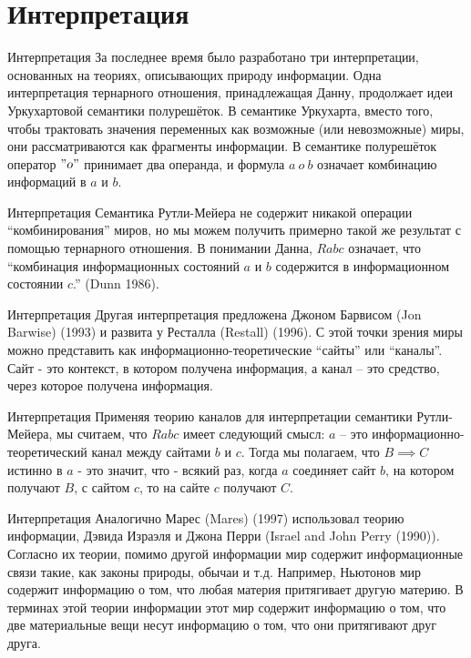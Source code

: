 \documentclass[14pt]{beamer}
\begin{document}
\section{Интерпретация}

\begin{frame}[nologo]{Интерпретация}
За последнее время было разработано три интерпретации, основанных на теориях, 
описывающих природу информации. Одна интерпретация тернарного отношения, 
принадлежащая Данну, продолжает идеи Уркухартовой семантики полурешёток. В 
семантике Уркухарта, вместо того, чтобы трактовать значения переменных как 
возможные (или невозможные) миры, они рассматриваются как фрагменты информации. 
В семантике полурешёток оператор $ "o" $ принимает два операнда, и формула $ 
a~o~b $ означает комбинацию информаций в $ a $ и $ b $.
\end{frame}

\begin{frame}[nologo]{Интерпретация}
Семантика Рутли-Мейера не содержит никакой операции ``комбинирования'' миров, 
но мы можем получить примерно такой же результат с помощью тернарного 
отношения. В понимании Данна, $ Rabc $ означает, что ``комбинация 
информационных состояний $ a $ и $ b $ содержится в информационном состоянии $ 
c $.'' (Dunn 1986).
\end{frame}

\begin{frame}[nologo]{Интерпретация}
Другая интерпретация предложена Джоном Барвисом (Jon Barwise) (1993) и развита 
у Ресталла (Restall) (1996). С этой точки зрения миры можно представить как 
информационно-теоретические ``сайты'' или ``каналы''. Сайт - это контекст, в 
котором получена информация, а канал -- это средство, через которое получена 
информация.
\end{frame}

\begin{frame}[nologo]{Интерпретация}
Применяя теорию каналов для интерпретации семантики Рутли-Мейера, 
мы считаем, что $ Rabc $ имеет следующий смысл: $ a $ -- это 
информационно-теоретический канал между сайтами $ b $ и $ c $. Тогда мы 
полагаем, что $ B \implies C $ истинно в $ a $ - это значит, что - всякий раз, 
когда $ a $ соединяет сайт $ b $, на котором получают $ B $, с сайтом $ c $, то 
на сайте $ c $ получают $ C $.
\end{frame}

\begin{frame}[nologo]{Интерпретация}
Аналогично Марес (Mares) (1997) использовал теорию информации, Дэвида Израэля и 
Джона Перри (Israel and John Perry (1990)). Согласно их теории, помимо другой 
информации мир содержит информационные связи такие, как законы природы, обычаи 
и т.д. Например, Ньютонов мир содержит информацию о том, что любая материя 
притягивает другую материю. В терминах этой теории информации этот мир содержит 
информацию о том, что две материальные вещи несут информацию о том, что они 
притягивают друг друга.
\end{frame}
\end{document}
